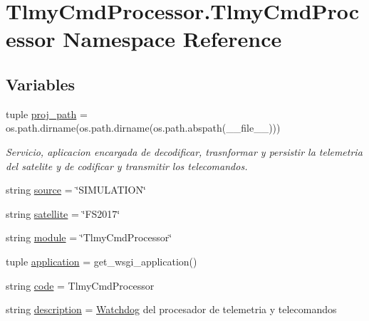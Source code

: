 \hypertarget{namespace_tlmy_cmd_processor_1_1_tlmy_cmd_processor}{}\section{Tlmy\+Cmd\+Processor.\+Tlmy\+Cmd\+Processor Namespace Reference}
\label{namespace_tlmy_cmd_processor_1_1_tlmy_cmd_processor}
\subsection*{Variables}
\begin{DoxyCompactItemize}
\item 
tuple \hyperlink{namespace_tlmy_cmd_processor_1_1_tlmy_cmd_processor_af01cc83846e14e401a5a2fbaec2fe940}{proj\+\_\+path} = os.\+path.\+dirname(os.\+path.\+dirname(os.\+path.\+abspath(\+\_\+\+\_\+file\+\_\+\+\_\+)))
\begin{DoxyCompactList}\small\item\em Servicio, aplicacion encargada de decodificar, trasnformar y persistir la telemetria del satelite y de codificar y transmitir los telecomandos. \end{DoxyCompactList}\item 
string \hyperlink{namespace_tlmy_cmd_processor_1_1_tlmy_cmd_processor_acef2a3d30bda6af9c56309eea6b12246}{source} = \char`\"{}S\+I\+M\+U\+L\+A\+T\+I\+O\+N\char`\"{}
\item 
string \hyperlink{namespace_tlmy_cmd_processor_1_1_tlmy_cmd_processor_a5cf95a9cff868554c46d7a901df74673}{satellite} = \char`\"{}F\+S2017\char`\"{}
\item 
string \hyperlink{namespace_tlmy_cmd_processor_1_1_tlmy_cmd_processor_a8f2365862c9bbb4fe399b2d3f801b4d5}{module} = \char`\"{}Tlmy\+Cmd\+Processor\char`\"{}
\item 
tuple \hyperlink{namespace_tlmy_cmd_processor_1_1_tlmy_cmd_processor_abc9fef542a08059c815604cf428eb8ea}{application} = get\+\_\+wsgi\+\_\+application()
\item 
string \hyperlink{namespace_tlmy_cmd_processor_1_1_tlmy_cmd_processor_a4b093dcc82bbec72c8869f3715934d92}{code} = \textquotesingle{}Tlmy\+Cmd\+Processor\textquotesingle{}
\item 
string \hyperlink{namespace_tlmy_cmd_processor_1_1_tlmy_cmd_processor_af826240cd995d7339c5f281ee8941333}{description} = \textquotesingle{}\hyperlink{class_ground_segment_1_1models_1_1_watchdog_1_1_watchdog}{Watchdog} del procesador de telemetria y telecomandos\textquotesingle{}

\end{DoxyCompactItemize}

